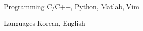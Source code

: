 

\begin{cvskills}

  \cvskill
    {Programming} %
    {C/C++, Python, Matlab, Vim} %

  \cvskill
    {Languages} %
    {Korean, English} %

\end{cvskills}
